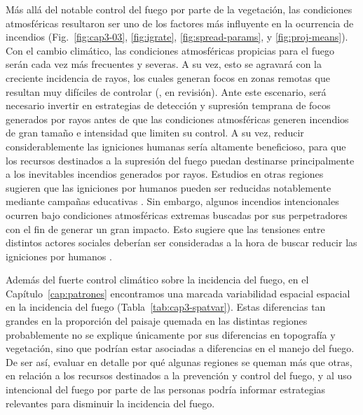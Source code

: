 Más allá del notable control del fuego por parte de la vegetación, las condiciones atmosféricas resultaron ser uno de los factores más influyente en la ocurrencia de incendios (Fig.~\ref{fig:cap3-03}, \ref{fig:igrate}, \ref{fig:spread-params}, y \ref{fig:proj-means}). Con el cambio climático, las condiciones atmosféricas propicias para el fuego serán cada vez más frecuentes y severas. A su vez, esto se agravará con la creciente incidencia de rayos, los cuales generan focos en zonas remotas que resultan muy difíciles de controlar (\citeauthor{kitzbergerLightning}, en revisión). Ante este escenario, será necesario invertir en estrategias de detección y supresión temprana de focos generados por rayos antes de que las condiciones atmosféricas generen incendios de gran tamaño e intensidad que limiten su control. A su vez, reducir considerablemente las igniciones humanas sería altamente beneficioso, para que los recursos destinados a la supresión del fuego puedan destinarse principalmente a los inevitables incendios generados por rayos. Estudios en otras regiones sugieren que las igniciones por humanos pueden ser reducidas notablemente mediante campañas educativas \citep{hesseln_wildland_2018}. Sin embargo, algunos incendios intencionales ocurren bajo condiciones atmosféricas extremas buscadas por sus perpetradores con el fin de generar un gran impacto. Esto sugiere que las tensiones entre distintos actores sociales deberían ser consideradas a la hora de buscar reducir las igniciones por humanos \citep{buhler2013demography}.

Además del fuerte control climático sobre la incidencia del fuego, en el Capítulo~\ref{cap:patrones} encontramos una marcada variabilidad espacial espacial en la incidencia del fuego (Tabla~\ref{tab:cap3-spatvar}). Estas diferencias tan grandes en la proporción del paisaje quemada en las distintas regiones probablemente no se explique únicamente por sus diferencias en topografía y vegetación, sino que podrían estar asociadas a diferencias en el manejo del fuego. De ser así, evaluar en detalle por qué algunas regiones se queman más que otras, en relación a los recursos destinados a la prevención y control del fuego, y al uso intencional del fuego por parte de las personas podría informar estrategias relevantes para disminuir la incidencia del fuego. 


